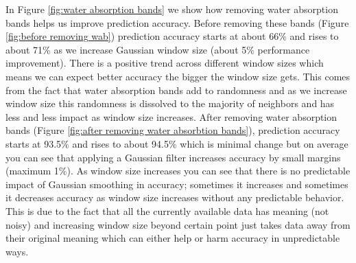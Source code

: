 \documentclass[remotesensing,article,accept,moreauthors,pdftex,12pt,a4paper]{mdpi}
\begin{document}



In Figure \ref{fig:water absorption bands} we show how removing water absorption bands helps us improve prediction accuracy. 
Before removing these bands (Figure \ref{fig:before removing wab}) prediction accuracy starts at about 66\% and rises to about 71\% as we increase Gaussian window size (about 5\% performance improvement). 
There is a positive trend across different window sizes which means we can expect better accuracy the bigger the window size gets. 
This comes from the fact that water absorption bands add to randomness and as we increase window size this randomness is dissolved to the majority of neighbors and has less and less impact as window size increases. 
After removing water absorption bands (Figure \ref{fig:after removing water absorbtion bands}), prediction accuracy starts at 93.5\% and rises to about 94.5\% which is minimal change but on average you can see that applying a Gaussian filter increases accuracy by small margins (maximum 1\%). 
As window size increases you can see that there is no predictable impact of Gaussian smoothing in accuracy; 
sometimes it increases and sometimes it decreases accuracy as window size increases without any predictable behavior. 
This is due to the fact that all the currently available data has meaning (not noisy) and increasing window size beyond certain point just takes data away from their original meaning which can either help or harm accuracy in unpredictable ways. 


\end{document}
